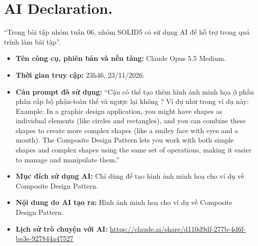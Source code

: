 \section*{AI Declaration.}
“Trong bài tập nhóm tuần 06, nhóm SOLID5 có sử dụng AI để hỗ trợ trong quá trình làm bài tập”.

\begin{itemize}
    \item[$-$] \textbf{Tên công cụ, phiên bản và nền tảng:} Claude Opus 5.5 Medium.
    \item[$-$] \textbf{Thời gian truy cập:} 23h46, 23/11/2026.
    \item[$-$] \textbf{Câu prompt đã sử dụng:} “Cậu có thể tạo thêm hình ảnh minh họa ở phần phân cấp bộ phận-toàn thể và ngược lại không ? 
                Ví dụ như trong ví dụ này: Example: In a graphic design application, you might have shapes as individual elements (like circles and rectangles), 
                and you can combine these shapes to create more complex shapes (like a smiley face with eyes and a mouth). 
                The Composite Design Pattern lets you work with both simple shapes and complex shapes using the same set of operations, 
                making it easier to manage and manipulate them.”
    \item[$-$] \textbf{Mục đích sử dụng AI:} Chỉ dùng để tạo hình ảnh minh hoạ cho ví dụ về Composite Design Pattern.
    \item[$-$] \textbf{Nội dung do AI tạo ra:} Hình ảnh minh hoạ cho ví dụ về Composite Design Pattern.
    \item[$-$] \textbf{Lịch sử trò chuyện với AI:} \url{https://claude.ai/share/d110d9df-277b-4d6f-be3e-927844a47527}
\end{itemize}
